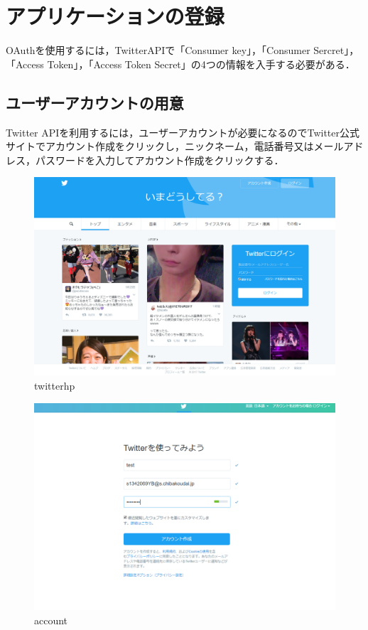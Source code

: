 \clearpage

\section{アプリケーションの登録}
OAuthを使用するには，TwitterAPIで「Consumer key」，「Consumer Sercret」，「Access Token」，「Access Token Secret」の4つの情報を入手する必要がある．

\subsection{ユーザーアカウントの用意}
Twitter APIを利用するには，ユーザーアカウントが必要になるのでTwitter公式サイトでアカウント作成をクリックし，ニックネーム，電話番号又はメールアドレス，パスワードを入力してアカウント作成をクリックする．
\begin{figure}[htb]
\centering
\includegraphics[width=15cm]{twitterhp.png}
\caption{twitterhp}\label{twitterhp}
\end{figure}

\begin{figure}[htb]
\centering
\includegraphics[width=15cm]{account.png}
\caption{account}\label{account}
\end{figure}
\clearpage
